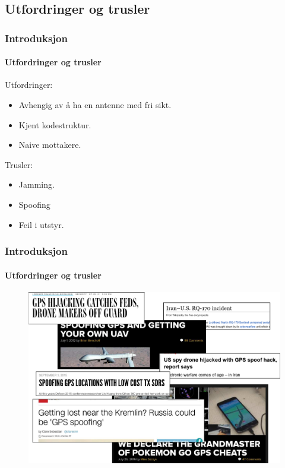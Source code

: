 \documentclass[xcolor=table]{beamer}
\begin{document}
\subsection{Utfordringer og trusler}
\begin{frame}
  \frametitle{Introduksjon}
\framesubtitle{Utfordringer og trusler}
  Utfordringer:
  \begin{itemize}
    \item Avhengig av å ha en antenne med fri sikt.
    \item Kjent kodestruktur.
    \item Naive mottakere.
  \end{itemize}
  Trusler:
  \begin{itemize}
    \item Jamming.
    \item Spoofing
    \item Feil i utstyr.
  \end{itemize} 
\end{frame}

\begin{frame}
  \frametitle{Introduksjon}
\framesubtitle{Utfordringer og trusler}
      \begin{figure}
        \includegraphics[scale=0.15]{thesis/graphics/montage.pdf}
      \end{figure} 
\end{frame}
\end{document}
